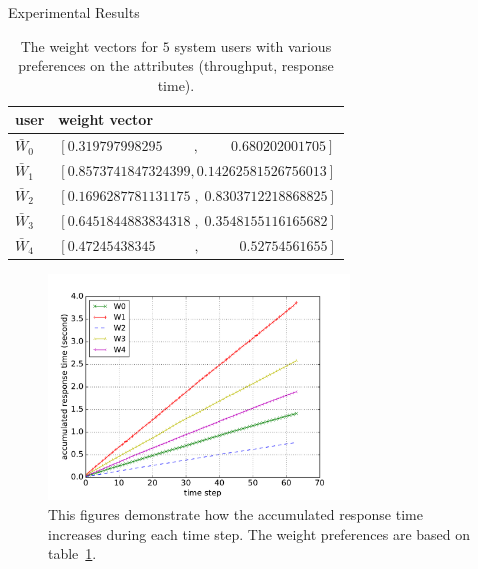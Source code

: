 \documentclass{beamer}
\begin{document}
\begin{frame}{Experimental Results}
\begin{table}
\begin{tabular}{ l | l | }
  user & weight vector \\
  \toprule
   $\bar{W}_0$ & $[0.319797998295 \;\;\;\;\;\;\;\;, \;\;\;\;\;\;\;\; 0.680202001705]$ \\
   $\bar{W}_1$ & $[0.8573741847324399 , 0.14262581526756013]$ \\
   $\bar{W}_2$ & $[0.1696287781131175\;,\; 0.8303712218868825]$ \\
   $\bar{W}_3$ & $[0.6451844883834318\;,\; 0.3548155116165682]$\\
   $\bar{W}_4$ & $[0.47245438345\;\;\;\;\;\;\;\;\;\; , \;\;\;\;\;\;\;\;\;\; 0.52754561655]$\\ 
 \end{tabular} 
 \caption{The weight vectors for $5$ system users with various preferences on the attributes (throughput, response time).} 
 \label{table:weights}
\end{table}
\end{frame}


\begin{frame}
	\begin{figure}[t]
\includegraphics[width=8cm]{iimas/rt_step_all++.pdf}
\caption{This figures demonstrate how the accumulated response time increases during each time step. The weight preferences are based on table~\ref{table:weights}.} 
\centering
\label{fig:rt-vs-timestep}
\end{figure}
\end{frame}
\end{document}
